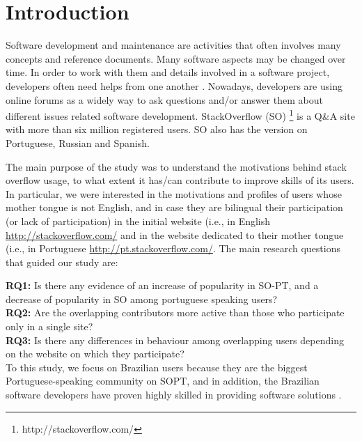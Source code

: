 \section{Introduction}

Software development and maintenance are activities that often involves many concepts and reference documents. Many software aspects may be changed over time. In order to work with them and details involved in a software project, developers often need helps from one another \cite{Wang2013}. Nowadays, developers are using online forums as a widely way to ask questions and/or answer them about different issues related software development. StackOverflow (SO) \footnote{http://stackoverflow.com/} is a Q\&A site with more than six million registered users. SO also has the version on Portuguese, Russian and Spanish. 

The main purpose of the study was to understand the motivations behind stack overflow usage, to what extent it has/can contribute to improve skills of its users. In particular, we were interested in the motivations and profiles of users whose mother tongue is not English, and in case they are bilingual their participation (or lack of participation) in the initial website (i.e., in English \url{http://stackoverflow.com/} and in the website dedicated to their mother tongue (i.e., in Portuguese \url{http://pt.stackoverflow.com/}. The main research questions that guided our study are:

\noindent\textbf{RQ1:} Is there any evidence of an increase of popularity
in SO-PT, and a decrease of popularity in SO among portuguese speaking users?\\
\textbf{RQ2:} Are the overlapping contributors more active than those who participate only in a single site? \\ 
\textbf{RQ3:} Is there any differences in behaviour among overlapping users depending on the website on which they participate?\\ 

To this study, we focus on Brazilian users because they are the biggest Portuguese-speaking community on SOPT, and in addition, the Brazilian software developers have proven highly skilled in providing software solutions .   
